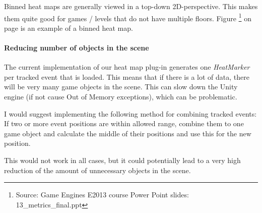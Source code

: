 Binned heat maps are generally viewed in a top-down 2D-perspective. This makes them quite good for games / levels that do not have multiple floors. Figure \footnote{Source: Game Engines E2013 course Power Point slides: 13\_metrics\_final.ppt} on page \pageref{fig:BHM} is an example of a binned heat map.

\paragraph{Reducing number of objects in the scene}
The current implementation of our heat map plug-in generates one \textit{HeatMarker} per tracked event that is loaded. This means that if there is a lot of data, there will be very many game objects in the scene. This can slow down the Unity engine (if not cause Out of Memory exceptions), which can be problematic. 

I would suggest implementing  the following method for combining tracked events: If two or more event positions are within allowed range, combine them to one game object and calculate the middle of their positions and use this for the new position.

This would not work in all cases, but it could potentially lead to a very high reduction of the amount of unnecessary objects in the scene.
